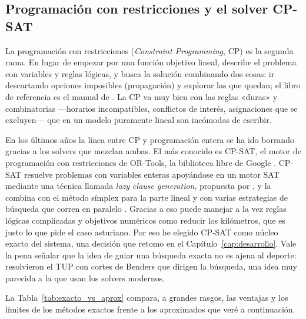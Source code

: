 \documentclass[11pt,a4paper,spanish]{book}
\numberwithin{equation}{chapter}
\numberwithin{figure}{chapter}
\numberwithin{table}{chapter}
\begin{document}
\subsection{Programación con restricciones y el solver CP-SAT}

La programación con restricciones (\emph{Constraint Programming}, CP) es la segunda rama. En lugar de empezar por una función objetivo lineal, describe el problema con variables y reglas lógicas, y busca la solución combinando dos cosas: ir descartando opciones imposibles (propagación) y explorar las que quedan; el libro de referencia es el manual de . La CP va muy bien con las reglas «duras» y combinatorias —horarios incompatibles, conflictos de interés, asignaciones que se excluyen— que en un modelo puramente lineal son incómodas de escribir.

En los últimos años la línea entre CP y programación entera se ha ido borrando gracias a los solvers que mezclan ambas. El más conocido es CP-SAT, el motor de programación con restricciones de OR-Tools, la biblioteca libre de Google \cite{ortools}. CP-SAT resuelve problemas con variables enteras apoyándose en un motor SAT mediante una técnica llamada \emph{lazy clause generation}, propuesta por , y la combina con el método símplex para la parte lineal y con varias estrategias de búsqueda que corren en paralelo \cite{cpsat}. Gracias a eso puede manejar a la vez reglas lógicas complicadas y objetivos numéricos como reducir los kilómetros, que es justo lo que pide el caso asturiano. Por eso he elegido CP-SAT como núcleo exacto del sistema, una decisión que retomo en el Capítulo~\ref{cap:desarrollo}. Vale la pena señalar que la idea de guiar una búsqueda exacta no es ajena al deporte:  resolvieron el TUP con cortes de Benders que dirigen la búsqueda, una idea muy parecida a la que usan los solvers modernos.

La Tabla~\ref{tab:exacto_vs_aprox} compara, a grandes rasgos, las ventajas y los límites de los métodos exactos frente a los aproximados que veré a continuación.
\end{document}
